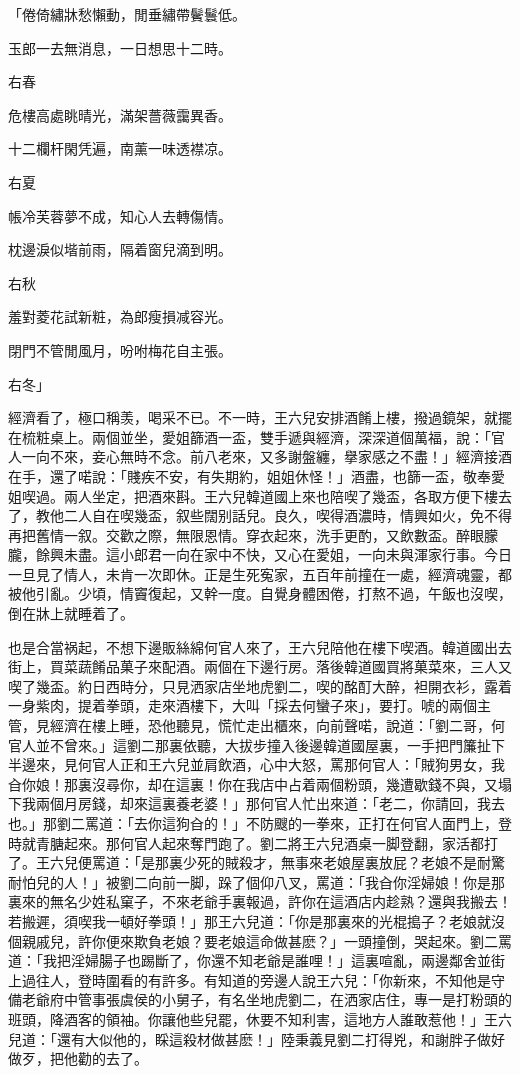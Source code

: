 「倦倚繡牀愁懶動，閒垂繡帶鬢鬟低。

玉郎一去無消息，一日想思十二時。

右春

危樓高處眺晴光，滿架薔薇靄異香。

十二欄杆閑凭遍，南薰一味透襟凉。

右夏

帳冷芙蓉夢不成，知心人去轉傷情。

枕邊淚似堦前雨，隔着窗兒滴到明。

右秋

羞對菱花試新粧，為郎瘦損减容光。

閉門不管閒風月，吩咐梅花自主張。

右冬」

經濟看了，極口稱羡，喝采不已。不一時，王六兒安排酒餚上樓，撥過鏡架，就擺在梳粧桌上。兩個並坐，愛姐篩酒一盃，雙手遞與經濟，深深道個萬福，說：「官人一向不來，妾心無時不念。前八老來，又多謝盤纏，擧家感之不盡！」經濟接酒在手，還了喏說：「賤疾不安，有失期約，姐姐休怪！」酒盡，也篩一盃，敬奉愛姐喫過。兩人坐定，把酒來斟。王六兒韓道國上來也陪喫了幾盃，各取方便下樓去了，教他二人自在喫幾盃，叙些闊别話兒。良久，喫得酒濃時，情興如火，免不得再把舊情一叙。交歡之際，無限恩情。穿衣起來，洗手更酌，又飲數盃。醉眼朦朧，餘興未盡。這小郎君一向在家中不快，又心在愛姐，一向未與渾家行事。今日一旦見了情人，未肯一次即休。正是生死寃家，五百年前撞在一處，經濟魂靈，都被他引亂。少頃，情竇復起，又幹一度。自覺身體困倦，打熬不過，午飯也沒喫，倒在牀上就睡着了。

也是合當祸起，不想下邊販絲綿何官人來了，王六兒陪他在樓下喫酒。韓道國出去街上，買菜蔬餚品菓子來配酒。兩個在下邊行房。落後韓道國買將菓菜來，三人又喫了幾盃。約日西時分，只見洒家店坐地虎劉二，喫的酩酊大醉，袒開衣衫，露着一身紫肉，提着拳頭，走來酒樓下，大叫「採去何蠻子來」，要打。唬的兩個主管，見經濟在樓上睡，恐他聽見，慌忙走出櫃來，向前聲喏，說道：「劉二哥，何官人並不曾來。」這劉二那裏依聽，大拔步撞入後邊韓道國屋裏，一手把門簾扯下半邊來，見何官人正和王六兒並肩飲酒，心中大怒，罵那何官人：「賊狗男女，我㒲你娘！那裏沒尋你，却在這裏！你在我店中占着兩個粉頭，幾遭歇錢不與，又塌下我兩個月房錢，却來這裏養老婆！」那何官人忙出來道：「老二，你請回，我去也。」那劉二罵道：「去你這狗㒲的！」不防颼的一拳來，正打在何官人面門上，登時就青膅起來。那何官人起來奪門跑了。劉二將王六兒酒桌一脚登翻，家活都打了。王六兒便罵道：「是那裏少死的賊殺才，無事來老娘屋裏放屁？老娘不是耐驚耐怕兒的人！」被劉二向前一脚，跺了個仰八叉，罵道：「我㒲你淫婦娘！你是那裏來的無名少姓私窠子，不來老爺手裏報過，許你在這酒店内趁熟？還與我搬去！若搬遲，須喫我一頓好拳頭！」那王六兒道：「你是那裏來的光棍搗子？老娘就沒個親戚兒，許你便來欺負老娘？要老娘這命做甚麽？」一頭撞倒，哭起來。劉二罵道：「我把淫婦腸子也踢斷了，你還不知老爺是誰哩！」這裏喧亂，兩邊鄰舍並街上過往人，登時圍看的有許多。有知道的旁邊人說王六兒：「你新來，不知他是守備老爺府中管事張虞侯的小舅子，有名坐地虎劉二，在洒家店住，專一是打粉頭的班頭，降酒客的領袖。你讓他些兒罷，休要不知利害，這地方人誰敢惹他！」王六兒道：「還有大似他的，睬這殺材做甚麽！」陸秉義見劉二打得兇，和謝胖子做好做歹，把他勸的去了。

